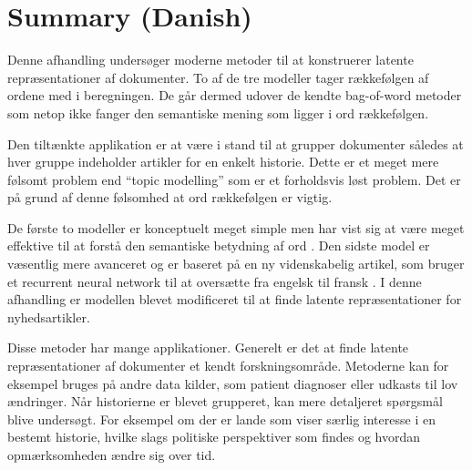 \chapter{Summary (Danish)}

Denne afhandling undersøger moderne metoder til at konstruerer latente repræsentationer af dokumenter. To af de tre modeller tager rækkefølgen af ordene med i beregningen. De går dermed udover de kendte bag-of-word metoder som netop ikke fanger den semantiske mening som ligger i ord rækkefølgen. 

Den tiltænkte applikation er at være i stand til at grupper dokumenter således at hver gruppe indeholder artikler for en enkelt historie. Dette er et meget mere følsomt problem end ``topic modelling'' som er et forholdsvis løst problem. Det er på grund af denne følsomhed at ord rækkefølgen er vigtig.

De første to modeller er konceptuelt meget simple men har vist sig at være meget effektive til at forstå den semantiske betydning af ord \cite{word2vec-details, doc2vec}. Den sidste model er væsentlig mere avanceret og er baseret på en ny videnskabelig artikel, som bruger et recurrent neural network til at oversætte fra engelsk til fransk \cite{sutskever}. I denne afhandling er modellen blevet modificeret til at finde latente repræsentationer for nyhedsartikler.

Disse metoder har mange applikationer. Generelt er det at finde latente repræsentationer af dokumenter et kendt forskningsområde. Metoderne kan for eksempel bruges på andre data kilder, som patient diagnoser eller udkasts til lov ændringer.
Når historierne er blevet grupperet, kan mere detaljeret spørgsmål blive undersøgt. For eksempel om der er lande som viser særlig interesse i en bestemt historie, hvilke slags politiske perspektiver som findes og hvordan opmærksomheden ændre sig over tid.
